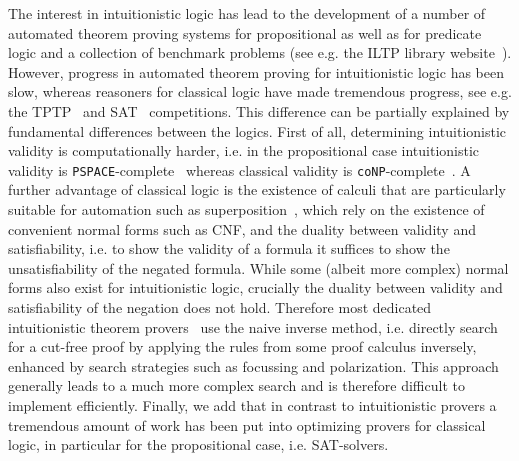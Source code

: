 \documentclass[a4paper,11pt]{report}
\theoremstyle{definition}
\theoremstyle{definition}
\theoremstyle{definition}
\theoremstyle{definition}
\theoremstyle{definition}
\theoremstyle{definition}
\theoremstyle{definition}
\begin{document}
	The interest in intuitionistic logic has lead to the development of a number of automated theorem proving systems for propositional as well as for predicate logic and a collection of benchmark problems (see e.g. the
	ILTP library website~\cite{iltp}).
	However, progress in automated theorem proving for intuitionistic logic has been slow, whereas reasoners for classical logic have made tremendous progress, see e.g. the TPTP~\cite{casc} and SAT~\cite{satc} competitions.
	This difference can be partially explained by fundamental differences between the logics.
	First of all, determining intuitionistic validity is computationally harder, i.e. in the propositional case intuitionistic validity is \verb+PSPACE+-complete~\cite{statman1979intuitionistic} whereas classical validity is \verb+coNP+-complete~\cite{cook1971complexity}.
	A further advantage of classical logic is the existence of calculi that are particularly suitable for automation such as superposition~\cite{bachmair2001resolution}, which rely on the existence of convenient normal forms such as CNF, and the duality between validity and satisfiability, i.e. to show the validity of a formula it suffices to show the unsatisfiability of the negated formula.
	While some (albeit more complex) normal forms also exist  for intuitionistic logic, crucially the duality between validity and satisfiability of the negation does not hold.
	Therefore most dedicated intuitionistic theorem provers~\cite{mclaughlin2009efficient, tammet1996resolution} use the naive inverse method, i.e. directly search for a cut-free proof by applying the rules from some proof calculus inversely, enhanced by search strategies such as focussing and polarization. This approach generally leads to a much more complex search and is therefore difficult to implement efficiently.
	Finally, we add that in contrast to intuitionistic provers a tremendous amount of work has been put into optimizing provers for classical logic, in particular for the propositional case, i.e. SAT-solvers.
	
\end{document}
